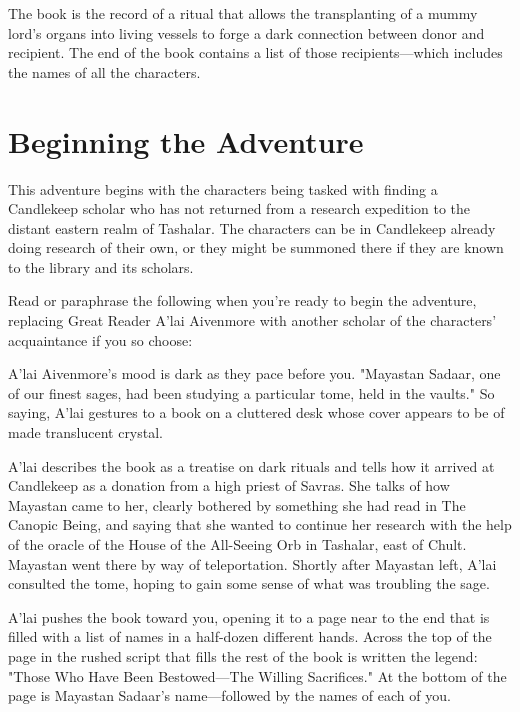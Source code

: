 \documentclass[10pt,a4paper,twoside,bg=print,twocolumn,openany,nodeprecatedcode]{dndbook}
\begin{document}
The book is the record of a ritual that allows the transplanting of a mummy lord's organs into living vessels to forge a dark connection between donor and recipient. The end of the book contains a list of those recipients—which includes the names of all the characters.

\section{Beginning the Adventure}
This adventure begins with the characters being tasked with finding a Candlekeep scholar who has not returned from a research expedition to the distant eastern realm of Tashalar. The characters can be in Candlekeep already doing research of their own, or they might be summoned there if they are known to the library and its scholars.

Read or paraphrase the following when you're ready to begin the adventure, replacing Great Reader A'lai Aivenmore with another scholar of the characters' acquaintance if you so choose:

\begin{DndReadAloud}{}
A'lai Aivenmore's mood is dark as they pace before you. "Mayastan Sadaar, one of our finest sages, had been studying a particular tome, held in the vaults." So saying, A'lai gestures to a book on a cluttered desk whose cover appears to be of made translucent crystal.

\end{DndReadAloud}

A'lai describes the book as a treatise on dark rituals and tells how it arrived at Candlekeep as a donation from a high priest of Savras. She talks of how Mayastan came to her, clearly bothered by something she had read in The Canopic Being, and saying that she wanted to continue her research with the help of the oracle of the House of the All-Seeing Orb in Tashalar, east of Chult. Mayastan went there by way of teleportation. Shortly after Mayastan left, A'lai consulted the tome, hoping to gain some sense of what was troubling the sage.

\begin{DndReadAloud}{}
A'lai pushes the book toward you, opening it to a page near to the end that is filled with a list of names in a half-dozen different hands. Across the top of the page in the rushed script that fills the rest of the book is written the legend: "Those Who Have Been Bestowed—The Willing Sacrifices." At the bottom of the page is Mayastan Sadaar's name—followed by the names of each of you.

\end{DndReadAloud}
\end{document}
